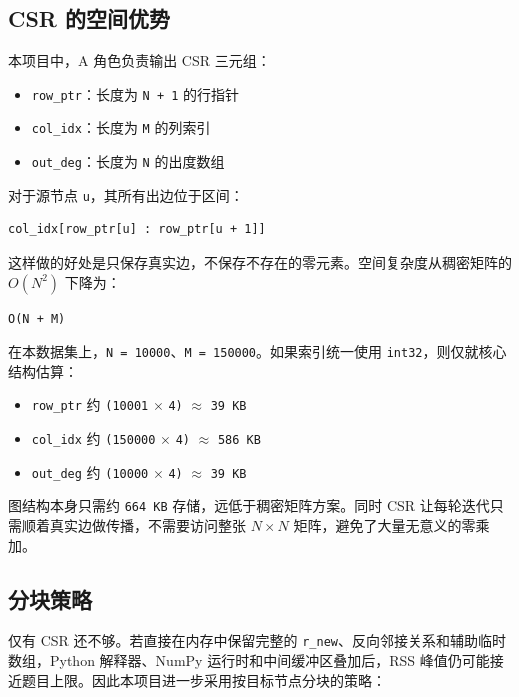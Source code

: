 \documentclass[UTF8,a4paper,12pt]{ctexart}
\begin{document}
\subsection{CSR 的空间优势}


本项目中，A 角色负责输出 CSR 三元组：


\begin{itemize}
\item \texttt{row\_ptr}：长度为 \texttt{N + 1} 的行指针
\item \texttt{col\_idx}：长度为 \texttt{M} 的列索引
\item \texttt{out\_deg}：长度为 \texttt{N} 的出度数组
\end{itemize}


对于源节点 \texttt{u}，其所有出边位于区间：


\begin{lstlisting}
col_idx[row_ptr[u] : row_ptr[u + 1]]
\end{lstlisting}


这样做的好处是只保存真实边，不保存不存在的零元素。空间复杂度从稠密矩阵的 $O(N^2)$ 下降为：


\begin{lstlisting}
O(N + M)
\end{lstlisting}


在本数据集上，\texttt{N = 10000}、\texttt{M = 150000}。如果索引统一使用 \texttt{int32}，则仅就核心结构估算：


\begin{itemize}
\item \texttt{row\_ptr} 约 \texttt{(10001} $\times$ \texttt{4)} $\approx$ \texttt{39 KB}
\item \texttt{col\_idx} 约 \texttt{(150000} $\times$ \texttt{4)} $\approx$ \texttt{586 KB}
\item \texttt{out\_deg} 约 \texttt{(10000} $\times$ \texttt{4)} $\approx$ \texttt{39 KB}
\end{itemize}


图结构本身只需约 \texttt{664 KB} 存储，远低于稠密矩阵方案。同时 CSR 让每轮迭代只需顺着真实边做传播，不需要访问整张 $N \times N$ 矩阵，避免了大量无意义的零乘加。


\subsection{分块策略}


仅有 CSR 还不够。若直接在内存中保留完整的 \texttt{r\_new}、反向邻接关系和辅助临时数组，Python 解释器、NumPy 运行时和中间缓冲区叠加后，RSS 峰值仍可能接近题目上限。因此本项目进一步采用按目标节点分块的策略：
\end{document}
